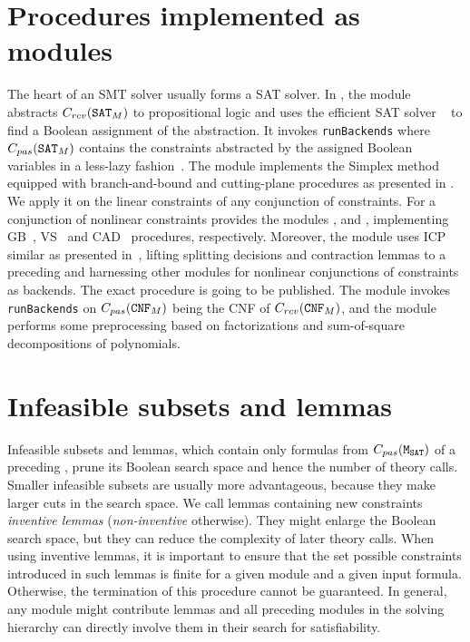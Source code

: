 \section{Procedures implemented as modules}
\label{sec:implemented_modules}
The heart of an SMT solver usually forms a SAT solver. In \smtrat, the module \satModule abstracts $C_{rcv}(\texttt{SAT$_M$})$ to propositional logic and uses the efficient SAT solver \minisat~\cite{minisat} to find a Boolean assignment of the abstraction. It invokes \texttt{runBackends} where $C_{pas}(\texttt{SAT$_M$})$ contains the constraints abstracted by the assigned Boolean variables in a less-lazy fashion~\cite{sebastiani2007lazy}. The module \simplexModule implements the Simplex method equipped with branch-and-bound and cutting-plane procedures as presented in \cite{DM06}. We apply it on the linear constraints of any conjunction of \supportedLogics constraints. For a conjunction of nonlinear constraints \smtrat provides the modules \gbModule, \vsModule and \cadModule, implementing GB~\cite{JLCA_CAI13}, VS~\cite{Article_Corzilius_FCT2011} and CAD~\cite{Article_Loup_TubeCAD} procedures, respectively. Moreover, the module \icpModule uses ICP similar as presented in~\cite{GGIGSC10}, lifting splitting decisions and contraction lemmas to a preceding \satModule and harnessing other modules for nonlinear conjunctions of constraints as backends. The exact procedure is going to be published. The module \cnfModule invokes \texttt{runBackends} on $C_{pas}(\texttt{CNF$_M$})$ being the CNF of $C_{rcv}(\texttt{CNF$_M$})$, and the module \ppModule performs some preprocessing based on factorizations and sum-of-square decompositions of polynomials.

\section{Infeasible subsets and lemmas}
\label{sec::infsubset_lemmas}
Infeasible subsets and lemmas, which contain only formulas from
$C_{pas}(\texttt{M$_\text{SAT}$})$ of a preceding \SATM, prune its Boolean search space and hence the number of theory calls. 
Smaller infeasible subsets are usually more advantageous, because they make larger cuts 
in the search space. We call lemmas containing new constraints \emph{inventive lemmas} (\emph{non-inventive} otherwise). 
They might enlarge the Boolean search space, but they can reduce the complexity of later theory calls.
When using inventive lemmas, it is important to ensure that the set possible
constraints introduced in such lemmas is finite for a given module and a given 
input formula. Otherwise, the termination of this procedure cannot be guaranteed. In general, any module might contribute lemmas 
and all preceding modules in the solving hierarchy can directly involve them in their search for satisfiability.
